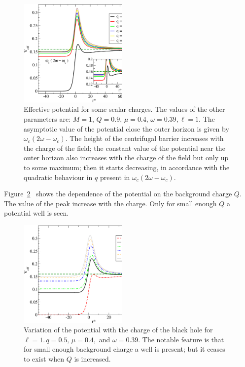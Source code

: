 \documentclass[aps, prd, twocolumn, amsmath, floats,floatfix, superscriptaddress,
nofootinbib, showpacs]{revtex4-1}
\begin{document}
\begin{figure}[!ht]
\includegraphics[width=0.47\textwidth]{m0.4_Q0.8_qs_w0.39.eps} 
\caption{Effective potential for some scalar charges. The values of the other
parameters are: $M=1,\,Q=0.9,\, \mu=0.4,\, \omega=0.39, \ell=1$. The  asymptotic value 
of the
potential close the outer horizon is given by $\omega_c(2\omega-\omega_c)$. The
height of the centrifugal barrier increases with the charge of the field; the constant 
value of the potential near the outer horizon also increases with the charge of the field
but only up to some maximum; then it starts decreasing, in accordance with the quadratic
behaviour in $q$ present in $\omega_c(2\omega-\omega_c)$.}
\label{fig:pot_char}
\end{figure}

Figure~\ref{fig:pot_hbchar} \  shows the dependence of the potential on the background
charge $Q$. The value of the peak increase with the charge. Only for small enough $Q$ a
potential well is seen. 



\begin{figure}[!ht]
\includegraphics[width=0.47\textwidth]{m0.4_Qs_q0.5_w0.39.eps}
\caption{Variation of the potential with the charge of the black hole for
$\ell = 1$.$\,q=0.5,\, \mu=0.4,$ and $\omega=0.39$. The notable feature is that for small
enough background charge a well is present; but it ceases to exist when $Q$ is increased.}
\label{fig:pot_hbchar}
\end{figure}
\end{document}

